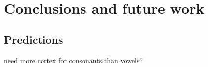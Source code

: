 \chapter{Conclusions and future work}



\section{Predictions}

need more cortex for consonants than vowels?
